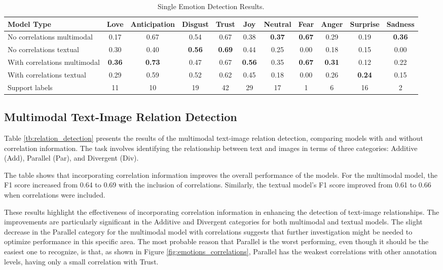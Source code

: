 \documentclass[letterpaper,journal]{IEEEtran}
\begin{document}
\begin{table}[htb!]
\setlength{\tabcolsep}{4pt}
\begin{center}
{\footnotesize
\begin{tabular}{l|c|c|c|c|c|c|c|c|c|c}
\hline
\textbf{Model Type} & \textbf{Love} & \textbf{Anticipation} & \textbf{Disgust} & \textbf{Trust} & \textbf{Joy} & \textbf{Neutral} & \textbf{Fear} & \textbf{Anger} & \textbf{Surprise} & \textbf{Sadness} \\
\hline
No correlations multimodal & 0.17 & 0.67 & 0.54 & 0.67 & 0.38 & \textbf{0.37} & \textbf{0.67} & 0.29 & 0.19 & \textbf{0.36} \\
No correlations textual & 0.30 & 0.40 & \textbf{0.56} & \textbf{0.69} & 0.44 & 0.25 & 0.00 & 0.18 & 0.15 & 0.00 \\
With correlations multimodal & \textbf{0.36} & \textbf{0.73} & 0.47 & 0.67 & \textbf{0.56} & 0.35 & \textbf{0.67} & \textbf{0.31} & 0.12 & 0.22 \\
With correlations textual & 0.29 & 0.59 & 0.52 & 0.62 & 0.45 & 0.18 & 0.00 & 0.26 & \textbf{0.24} & 0.15 \\
\hline
Support labels & 11 & 10 & 19 & 42 & 29 & 17 & 1 & 6 & 16 & 2 \\
\hline
\end{tabular}
}
\end{center}
\setlength{\belowcaptionskip}{-0.1cm}
\caption{Single Emotion Detection Results.}
\label{tb:single_emotion}
\end{table}

\subsection{Multimodal Text-Image Relation Detection}

Table \ref{tb:relation_detection} presents the results of the multimodal text-image relation detection, comparing models with and without correlation information. The task involves identifying the relationship between text and images in terms of three categories: Additive (Add), Parallel (Par), and Divergent (Div).

The table shows that incorporating correlation information improves the overall performance of the models. For the multimodal model, the F1 score increased from 0.64 to 0.69 with the inclusion of correlations. Similarly, the textual model's F1 score improved from 0.61 to 0.66 when correlations were included.

These results highlight the effectiveness of incorporating correlation information in enhancing the detection of text-image relationships. The improvements are particularly significant in the Additive and Divergent categories for both multimodal and textual models. The slight decrease in the Parallel category for the multimodal model with correlations suggests that further investigation might be needed to optimize performance in this specific area. The most probable reason that Parallel is the worst performing, even though it should be the easiest one to recognize, is that, as shown in Figure \ref{fig:emotions_correlations}, Parallel has the weakest correlations with other annotation levels, having only a small correlation with Trust.
\end{document}
